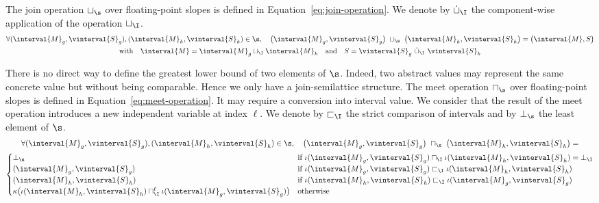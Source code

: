 The join operation $\sqcup_\s$ over floating-point slopes is defined
in Equation~\eqref{eq:join-operation}. We denote by $\dot{\sqcup}_\I$
the component-wise application of the operation $\sqcup_\I$.  {\small
  \begin{multline}
    \label{eq:join-operation}
    \forall (\interval{M}_g, \vinterval{S}_g), 
    (\interval{M}_h, \vinterval{S}_h) \in \s, \quad
    \big(\interval{M}_g, \vinterval{S}_g\big) \ 
    \sqcup_\s\ \big(\interval{M}_h, \vinterval{S}_h\big) = \big(\interval{M},
    S\big) 
    \\
    \text{with}\quad
    \interval{M} = \interval{M}_g 
    \sqcup_\I \interval{M}_h \quad\text{and}\quad S = \vinterval{S}_g\
    \dot{\sqcup}_\I\ \vinterval{S}_h 
  \end{multline}
}

There is no direct way to define the greatest lower bound of two
elements of $\s$. Indeed, two abstract values may represent the same
concrete value but without being comparable. Hence we only have a
join-semilattice structure. The meet operation $\sqcap_\s$ over
floating-point slopes is defined in
Equation~\eqref{eq:meet-operation}. It may require a conversion into
interval value. We consider that the result of the meet operation
introduces a new independent variable at index $\ell$. We denote by
$\sqsubset_\I$ the strict comparison of intervals and by $\bot_\s$ the
least element of $\s$. {\small
  \begin{multline}
    \label{eq:meet-operation}
    \forall (\interval{M}_g, \vinterval{S}_g), 
    (\interval{M}_h, \vinterval{S}_h) \in \s, \quad  
    \big(\interval{M}_g, \vinterval{S}_g\big) 
    \ \sqcap_\s\
    \big(\interval{M}_h, \vinterval{S}_h\big) = 
    \\
    \begin{cases}
      \bot_\s 
      & \text{if } \iota(\interval{M}_g, \vinterval{S}_g) 
      \sqcap_\I \iota(\interval{M}_h, \vinterval{S}_h) = \bot_\I
      \\
     (\interval{M}_g, \vinterval{S}_g) 
     & \text{if } \iota(\interval{M}_g, \vinterval{S}_g) 
     \sqsubset_\I \iota(\interval{M}_h, \vinterval{S}_h)
     \\
     (\interval{M}_h, \vinterval{S}_h) 
     & \text{if } \iota(\interval{M}_h, \vinterval{S}_h) 
     \sqsubset_\I \iota(\interval{M}_g, \vinterval{S}_g)
     \\
     \kappa\big(\iota(\interval{M}_h, \vinterval{S}_h) 
     \sqcap^\ell_\I \iota(\interval{M}_g, \vinterval{S}_g)\big) 
     & \text{otherwise}
    \end{cases}
  \end{multline}
}

